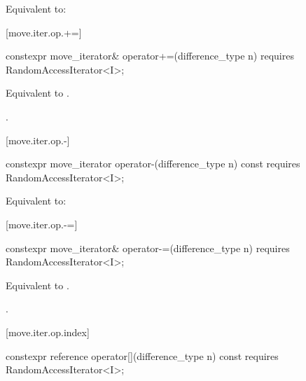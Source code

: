 \begin{itemdescr}
\pnum
\effects Equivalent to:
\end{itemdescr}

[move.iter.op.+=]{}

%
%
\begin{itemdecl}
constexpr move_iterator& operator+=(difference_type n)
  requires RandomAccessIterator<I>;
\end{itemdecl}

\begin{itemdescr}
\pnum
\effects Equivalent to .

\pnum
\returns {}.
\end{itemdescr}

[move.iter.op.-]{}

%
%
\begin{itemdecl}
constexpr move_iterator operator-(difference_type n) const
  requires RandomAccessIterator<I>;
\end{itemdecl}

\begin{itemdescr}
\pnum
\effects Equivalent to:
\end{itemdescr}

[move.iter.op.-=]{}

%
%
\begin{itemdecl}
constexpr move_iterator& operator-=(difference_type n)
  requires RandomAccessIterator<I>;
\end{itemdecl}

\begin{itemdescr}
\pnum
\effects Equivalent to .

\pnum
\returns {}.
\end{itemdescr}

[move.iter.op.index]{}

%
%
\begin{itemdecl}
constexpr reference operator[](difference_type n) const
  requires RandomAccessIterator<I>;
\end{itemdecl}

